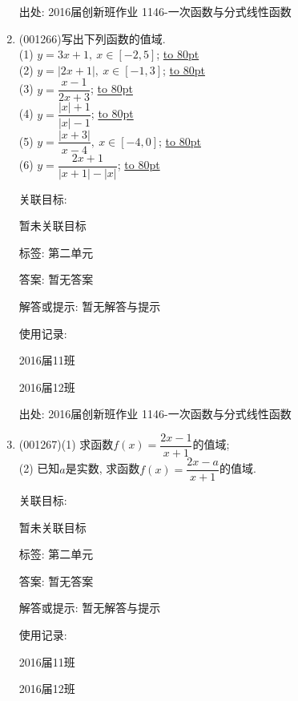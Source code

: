 \documentclass[10pt,a4paper]{article}
\newcommand{\blank}[1]{\underline{\hbox to #1pt{}}}
\begin{document}
\begin{enumerate}[1.]
出处: 2016届创新班作业	1146-一次函数与分式线性函数
\item { (001266)}写出下列函数的值域.\\ 
(1) $y=3x+1, \ x \in [-2,5]$; \blank{80}\\ 
(2) $y=|2x+1|, \ x \in [-1,3]$; \blank{80}\\ 
(3) $y=\dfrac{x-1}{2x+3}$; \blank{80}\\ 
(4) $y=\dfrac{|x|+1}{|x|-1}$; \blank{80}\\ 
(5) $y=\dfrac{|x+3|}{x-4}, \ x \in [-4,0]$; \blank{80}\\ 
(6) $y=\dfrac{2x+1}{|x+1|-|x|}$; \blank{80}


关联目标:

暂未关联目标



标签: 第二单元

答案: 暂无答案

解答或提示: 暂无解答与提示

使用记录:

2016届11班						

2016届12班						


出处: 2016届创新班作业	1146-一次函数与分式线性函数
\item { (001267)}(1) 求函数$f(x)=\dfrac{2x-1}{x+1}$的值域;\\ 
(2) 已知$a$是实数, 求函数$f(x)=\dfrac{2x-a}{x+1}$的值域.


关联目标:

暂未关联目标



标签: 第二单元

答案: 暂无答案

解答或提示: 暂无解答与提示

使用记录:

2016届11班		

2016届12班		



\end{enumerate}
\end{document}
